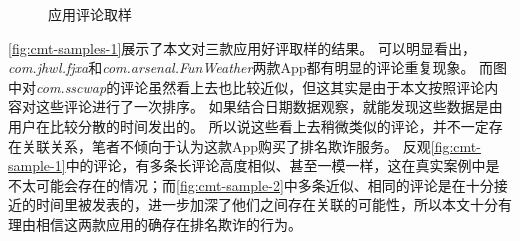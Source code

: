 \begin{figure}[htbp]
	\centering
	\hfill

	\hfill

	\hfill
    \caption{应用评论取样}
    \label{fig:cmt-samples-1}
\end{figure}

\autoref{fig:cmt-samples-1}展示了本文对三款应用好评取样的结果。
可以明显看出，\emph{com.jhwl.fjxa}和\emph{com.arsenal.FunWeather}两款App都有明显的评论重复现象。
而图中对\emph{com.sscwap}的评论虽然看上去也比较近似，但这其实是由于本文按照评论内容对这些评论进行了一次排序。
如果结合日期数据观察，就能发现这些数据是由用户在比较分散的时间发出的。
所以说这些看上去稍微类似的评论，并不一定存在关联关系，笔者不倾向于认为这款App购买了排名欺诈服务。
反观\autoref{fig:cmt-sample-1}中的评论，有多条长评论高度相似、甚至一模一样，这在真实案例中是不太可能会存在的情况；而\autoref{fig:cmt-sample-2}中多条近似、相同的评论是在十分接近的时间里被发表的，进一步加深了他们之间存在关联的可能性，所以本文十分有理由相信这两款应用的确存在排名欺诈的行为。

